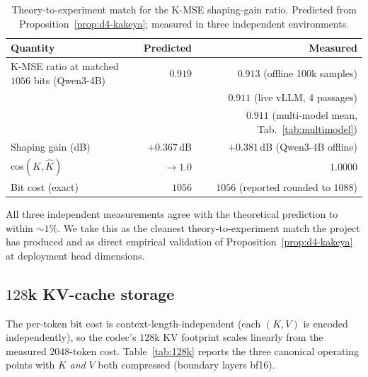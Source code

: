 \documentclass[11pt,a4paper]{article}
\theoremstyle{definition}
\theoremstyle{plain}
\begin{document}
\begin{table}[H]
\centering
\small
\caption{Theory-to-experiment match for the K-MSE shaping-gain
ratio. Predicted from Proposition~\ref{prop:d4-kakeya}; measured in
three independent environments.}
\label{tab:theory-vs-exp}
\begin{tabular}{lrr}
  \toprule
  Quantity & Predicted & Measured \\
  \midrule
  K-MSE ratio at matched $1056$ bits (Qwen3-4B)  & $0.919$      & $\mathbf{0.913}$ (offline 100k samples) \\
                                                 &              & $\mathbf{0.911}$ (live vLLM, 4 passages) \\
                                                 &              & $\mathbf{0.911}$ (multi-model mean, Tab.~\ref{tab:multimodel}) \\
  Shaping gain (dB)                              & $+0.367\,$dB & $+0.381\,$dB (Qwen3-4B offline) \\
  cos$(K,\hat K)$                                & $\to 1.0$    & $1.0000$ \\
  Bit cost (exact)                               & $1056$       & $1056$ (reported rounded to $1088$) \\
  \bottomrule
\end{tabular}
\end{table}

All three independent measurements agree with the theoretical
prediction to within $\sim 1\%$. We take this as the cleanest
theory-to-experiment match the project has produced and as direct
empirical validation of Proposition~\ref{prop:d4-kakeya} at
deployment head dimensions.

\subsection{$128$k KV-cache storage}
\label{sec:bench-128k}

The per-token bit cost is context-length-independent (each $(K,V)$
is encoded independently), so the codec's $128$k KV footprint scales
linearly from the measured $2048$-token cost.
Table~\ref{tab:128k} reports the three canonical operating points
with $K$ \emph{and} $V$ both compressed (boundary layers bf16).
\end{document}

